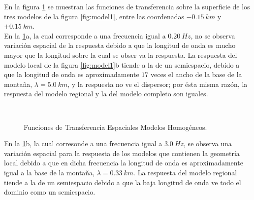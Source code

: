 \documentclass[spanish,letterpaper,12pt,twoside,openany]{article}
\begin{document}
En la figura \ref{fig:ftspatial} se muestran las funciones de transferencia sobre la superficie de los tres modelos de la figura \ref{fig:model1}, entre las coordenadas $-0.15\ km$ y $+0.15\ km$.\\
%
En la \cref{fig:ftspatial}a, la cual corresponde a una frecuencia igual a $0.20\ Hz$, no se observa variación espacial de la respuesta debido a que la longitud de onda es mucho mayor que la longitud sobre la cual se obser va la respuesta. La respuesta del modelo local de la figura \ref{fig:model1}b tiende a la de un semiespacio, debido a que la longitud de onda es aproximadamente $17$ veces el ancho de la base de la montaña, $\lambda= 5.0\ km$, y la respuesta no ve el dispersor; por ésta misma razón, la respuesta del modelo regional y la del modelo completo son iguales.
%
\begin{figure}[H]
	\centering
	\\
	\vspace{-.5 cm}
    \caption{Funciones de Transferencia Espaciales Modelos Homogéneos.}
    \label{fig:ftspatial}
    \vspace{-1 cm}
\end{figure}
%
En la \cref{fig:ftspatial}b, la cual corresonde a una frecuencia igual a $3.0\ Hz$, se observa una variación espacial para la respuesta de los modelos que contienen la geometría local debido a que en dicha frecuencia la longitud de onda es aproximadamente igual a la base de la montaña, $\lambda = 0.33\ km$. La respuesta del modelo regional tiende a la de un semiespacio debido a que la baja longitud de onda ve todo el dominio como un semiespacio.
\end{document}
